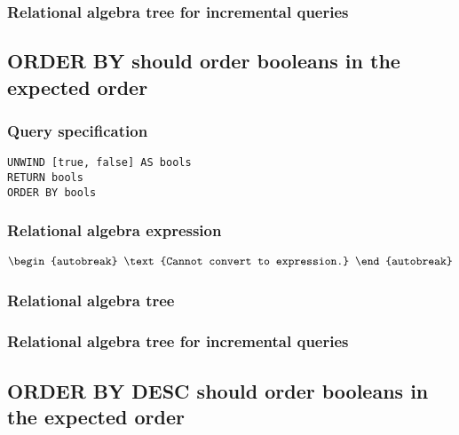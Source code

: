 \subsubsection*{Relational algebra tree for incremental queries}


\subsection{ORDER BY should order booleans in the expected order}

\subsubsection*{Query specification}

\begin{lstlisting}
UNWIND [true, false] AS bools
RETURN bools
ORDER BY bools
\end{lstlisting}

\subsubsection*{Relational algebra expression}

\begin{align*}
\begin{autobreak}
\text{Cannot convert to expression.}
\end{autobreak}
\end{align*}

\subsubsection*{Relational algebra tree}


\subsubsection*{Relational algebra tree for incremental queries}


\subsection{ORDER BY DESC should order booleans in the expected order}

